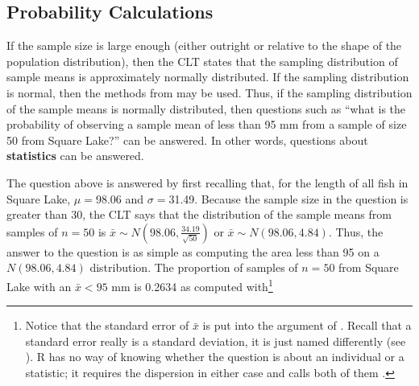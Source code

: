 \documentclass[10pt,openany]{book}\usepackage[]{graphicx}\usepackage[]{color}
\begin{document}
\vspace{-24pt}
\subsection{Probability Calculations} \label{sect:sdprob} 
\vspace{-12pt}
If the sample size is large enough (either outright or relative to the shape of the population distribution), then the CLT states that the sampling distribution of sample means is approximately normally distributed.  If the sampling distribution is normal, then the methods from  may be used.  Thus, if the sampling distribution of the sample means is normally distributed, then questions such as ``what is the probability of observing a sample mean of less than 95 mm from a sample of size 50 from Square Lake?'' can be answered.  In other words, questions about \textbf{statistics} can be answered.

The question above is answered by first recalling that, for the length of all fish in Square Lake, $\mu=$98.06 and $\sigma=$31.49.  Because the sample size in the question is greater than 30, the CLT says that the distribution of the sample means from samples of $n=50$ is $\bar{x}\sim N(98.06,\frac{34.19}{\sqrt{50}})$ or $\bar{x}\sim N(98.06,4.84)$.  Thus, the answer to the question is as simple as computing the area less than 95 on a $N(98.06,4.84)$ distribution.  The proportion of samples of $n=50$ from Square Lake with an $\bar{x}<95$ mm is 0.2634  as computed with\footnote{Notice that the standard error of $\bar{x}$ is put into the  argument of .  Recall that a standard error really is a standard deviation, it is just named differently (see ).  R has no way of knowing whether the question is about an individual or a statistic; it requires the dispersion in either case and calls both of them .}
\end{document}
